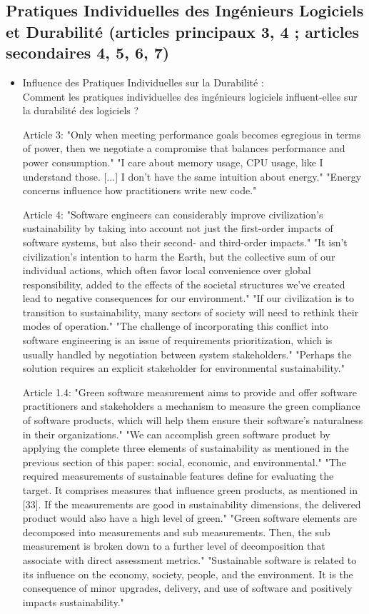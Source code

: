 \subsection{Pratiques Individuelles des Ingénieurs Logiciels et Durabilité (articles principaux 3, 4 ; articles secondaires 4, 5, 6, 7)}
\begin{itemize}
    \item Influence des Pratiques Individuelles sur la Durabilité : \\
    Comment les pratiques individuelles des ingénieurs logiciels influent-elles sur la durabilité des logiciels ?

Article 3:
"Only when meeting performance goals becomes egregious in terms of power, then we negotiate a compromise that balances performance and power consumption."
"I care about memory usage, CPU usage, like I understand those. [...] I don’t have the same intuition about energy."
"Energy concerns influence how practitioners write new code."

Article 4:
"Software engineers can considerably improve civilization’s sustainability by taking into account not just the first-order impacts of software systems, but also their second- and third-order impacts."
"It isn’t civilization’s intention to harm the Earth, but the collective sum of our individual actions, which often favor local convenience over global responsibility, added to the effects of the societal structures we’ve created lead to negative consequences for our environment."
"If our civilization is to transition to sustainability, many sectors of society will need to rethink their modes of operation."
"The challenge of incorporating this conflict into software engineering is an issue of requirements prioritization, which is usually handled by negotiation between system stakeholders." 
"Perhaps the solution requires an explicit stakeholder for environmental sustainability."

Article 1.4:
"Green software measurement aims to provide and offer software practitioners and stakeholders a mechanism to measure the green compliance of software products, which will help them ensure their software's naturalness in their organizations." 
"We can accomplish green software product by applying the complete three elements of sustainability as mentioned in the previous section of this paper: social, economic, and environmental." 
"The required measurements of sustainable features define for evaluating the target. It comprises measures that influence green products, as mentioned in [33]. If the measurements are good in sustainability dimensions, the delivered product would also have a high level of green." 
"Green software elements are decomposed into measurements and sub measurements. Then, the sub measurement is broken down to a further level of decomposition that associate with direct assessment metrics." 
"Sustainable software is related to its influence on the economy, society, people, and the environment. It is the consequence of minor upgrades, delivery, and use of software and positively impacts sustainability."


\end{itemize}
